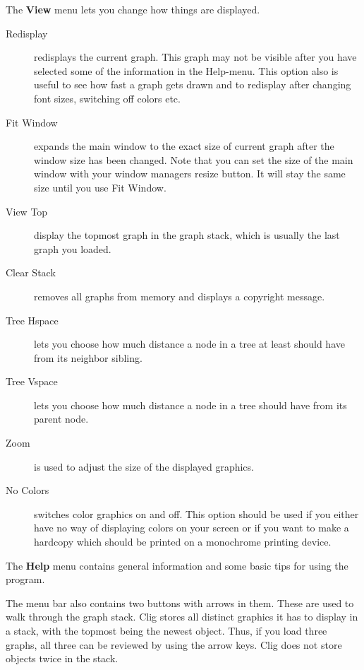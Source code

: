 The {\bf View} menu lets you change how things are displayed.

\begin{description}
\item[Redisplay] redisplays the current graph. This graph may not be visible
after you have selected some of the information in the Help-menu. This
option also is useful to see how fast a graph gets drawn and to
redisplay after changing font sizes, switching off colors etc.

\item[Fit Window] expands the main window to the exact size of current
graph after the window size has been changed. Note that you can set the
size of the main window with your window managers resize button. It
will stay the same size until you use Fit Window.

\item[View Top] display the topmost graph in the graph stack, which is
usually the last graph you loaded.

\item[Clear Stack] removes all graphs from memory and displays a copyright
message.

\item[Tree Hspace] lets you choose how much distance a node in a tree
at least should have from its neighbor sibling.

\item[Tree Vspace] lets you choose how much distance a node in a tree
should have from its parent node.

\item[Zoom] is used to adjust the size of the displayed graphics. 

\item[No Colors] switches color graphics on and off. This option should
be used if you either have no way of displaying colors on your screen
or if you want to make a hardcopy which should be printed on a
monochrome printing device.
\end{description}

The {\bf Help} menu contains general information and some basic tips
for using the program.

The menu bar also contains two buttons with arrows in them. These are
used to walk through the graph stack. {\sc Clig} stores all distinct
graphics it has to display in a stack, with the topmost being the newest
object. Thus, if you load three graphs, all three can be reviewed by
using the arrow keys. {\sc Clig} does not store objects twice in the
stack.

